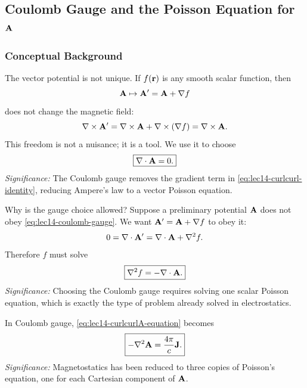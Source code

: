\subsection{Coulomb Gauge and the Poisson Equation for \texorpdfstring{$\mathbf{A}$}{A}}\label{subsec:lec14-coulomb-gauge}

\subsubsection*{Conceptual Background}
The vector potential is not unique.  If $f(\mathbf{r})$ is any smooth scalar function, then
\begin{equation}\label{eq:lec14-gauge-transformation}
  \mathbf{A}\mapsto \mathbf{A}'=\mathbf{A}+\nabla f
\end{equation}
does not change the magnetic field:
\begin{equation}\label{eq:lec14-gauge-B-invariant}
  \nabla\times\mathbf{A}'
  =\nabla\times\mathbf{A}+\nabla\times(\nabla f)
  =\nabla\times\mathbf{A}.
\end{equation}
This freedom is not a nuisance; it is a tool.  We use it to choose
\begin{equation}\label{eq:lec14-coulomb-gauge}
  \boxed{\nabla \cdot\mathbf{A}=0.}
\end{equation}
\textit{Significance:} The Coulomb gauge removes the gradient term in
\eqref{eq:lec14-curlcurl-identity}, reducing Ampere's law to a vector Poisson equation.

Why is the gauge choice allowed?  Suppose a preliminary potential $\mathbf{A}$ does not obey
\eqref{eq:lec14-coulomb-gauge}.  We want $\mathbf{A}'=\mathbf{A}+\nabla f$ to obey it:
\begin{equation}\label{eq:lec14-gauge-condition-derivation}
  0=\nabla \cdot\mathbf{A}'=\nabla \cdot\mathbf{A}+\nabla^2 f.
\end{equation}
Therefore $f$ must solve
\begin{equation}\label{eq:lec14-gauge-poisson}
  \boxed{\nabla^2 f=-\nabla \cdot\mathbf{A}.}
\end{equation}
\textit{Significance:} Choosing the Coulomb gauge requires solving one scalar Poisson
equation, which is exactly the type of problem already solved in electrostatics.

In Coulomb gauge, \eqref{eq:lec14-curlcurlA-equation} becomes
\begin{equation}\label{eq:lec14-vector-poisson}
  \boxed{-\nabla^2\mathbf{A}=\frac{4\pi}{c}\mathbf{J}.}
\end{equation}
\textit{Significance:} Magnetostatics has been reduced to three copies of Poisson's
equation, one for each Cartesian component of $\mathbf{A}$.

